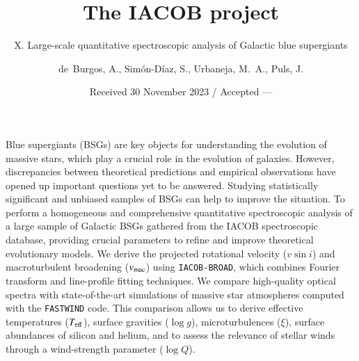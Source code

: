 \documentclass{aa}
\newcommand{\vsini}{\mbox{$v\sin i$}\xspace}
\newcommand{\vmac} {$v_{\rm mac}$\xspace}
\newcommand{\vmic}{$\xi$\xspace}
\newcommand{\Teff}{\mbox{$T_{\rm eff}$}\xspace}
\newcommand{\logg}{\mbox{$\log g$}\xspace}
\newcommand{\logQ}{\mbox{$\log Q$}\xspace}
\begin{document}
%
\title{The IACOB project}
%
\subtitle{X. Large-scale quantitative spectroscopic analysis of Galactic blue supergiants}
%
%
\author{de~Burgos, A., Simón-Díaz, S., Urbaneja, M.~A.\inst{3\orcidC{}}, Puls, J.\inst{4\orcidC{}}}
%
%
%
\date{Received 30 November 2023 / Accepted ---}
\abstract %
{Blue supergiants (BSGs) are key objects for understanding the evolution of massive stars, which play a crucial role in the evolution of galaxies. However, discrepancies between theoretical predictions and empirical observations have opened up important questions yet to be answered. Studying statistically significant and unbiased samples of BSGs can help to improve the situation.
}
{To perform a homogeneous and comprehensive quantitative spectroscopic analysis of a large sample of Galactic BSGs gathered from the IACOB spectroscopic database, providing crucial parameters to refine and improve theoretical evolutionary models.
}
{We derive the projected rotational velocity (\vsini) and macroturbulent broadening (\vmac) using {\tt IACOB-BROAD}, which combines Fourier transform and line-profile fitting techniques. We compare high-quality optical spectra with state-of-the-art simulations of massive star atmospheres computed with the {\tt FASTWIND} code. This comparison allows us to derive effective temperatures (\Teff), surface gravities (\logg), microturbulences (\vmic), surface abundances of silicon and helium, and to assess the relevance of stellar winds through a wind-strength parameter (\logQ).
}
\end{document}
